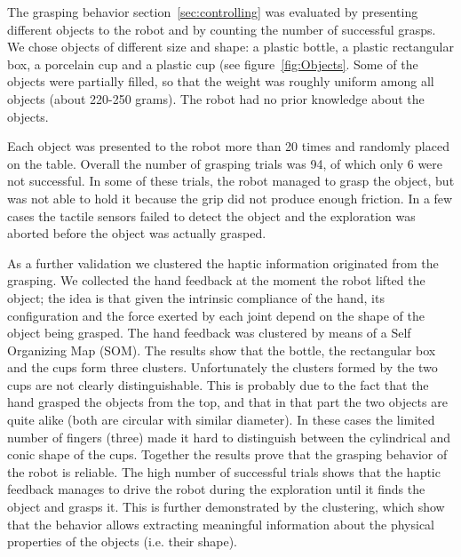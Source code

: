 
The grasping behavior section~\ref{sec:controlling} was evaluated 
by presenting different objects to the robot and by counting the 
number of successful grasps.
We chose objects of different size and shape: a plastic bottle, 
a plastic rectangular box, a porcelain cup and a plastic cup 
(see figure~\ref{fig:Objects}. Some of the objects were partially
filled, so that the weight was roughly uniform among all objects 
(about 220-250 grams). The robot had no prior knowledge about the objects.

Each object was presented to the robot more than 20 times and randomly placed
on the table. Overall the number of grasping trials was 94, of which only
6 were not successful. In some of these
trials, the robot managed to grasp the object, but was not able to hold it
because the grip did not produce enough friction. In a few cases the
tactile sensors failed to detect the object and the exploration was aborted
before the object was actually grasped.

As a further validation we clustered the haptic information originated from
the grasping. We collected the hand feedback at the moment the robot lifted the
object; the idea is that given the intrinsic compliance of the hand, its
configuration and the force exerted by each joint depend on the shape of the
object being grasped.
The hand feedback was clustered by means of a Self Organizing Map (SOM). The results
show that the bottle, the rectangular box and the cups form three clusters.
Unfortunately the clusters formed by the two cups are not clearly distinguishable.
This is probably due to the fact that the hand grasped the objects from the
top, and that in that part the two objects are quite alike (both are circular with
similar diameter). In these cases the limited number of fingers (three)
made it hard to distinguish between the cylindrical and conic shape of the cups.
Together the results prove that the grasping behavior of
the robot is reliable. The high number of successful trials shows that the haptic
feedback manages to drive the robot during the exploration until it
finds the object and grasps it. This is further demonstrated by the clustering,
which show that the behavior allows extracting meaningful information about the
physical properties of the objects (i.e. their shape).

